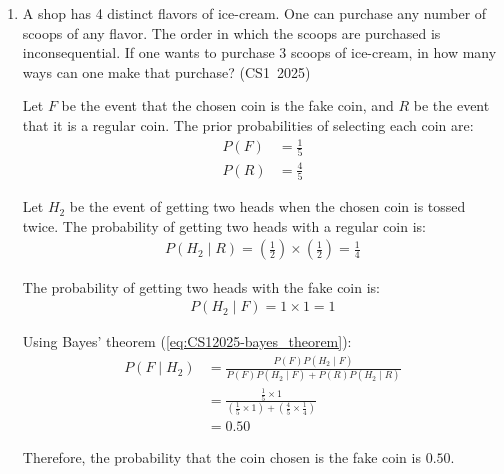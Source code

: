 \begin{enumerate}[label=\thesubsection.\arabic*, ref=\thesubsection.\theenumi]
\vspace{0.5cm}
\item A shop has 4 distinct flavors of ice-cream. One can purchase any number of scoops of any flavor. The order in which the scoops are purchased is inconsequential. If one wants to purchase 3 scoops of ice-cream, in how many ways can one make that purchase?
\hfill (CS1~2025)
\begin{enumerate}
	\begin{multicols}{4}
    \item $4$
    \item $20$
    \item $24$
    \item $48$
	\end{multicols}
\end{enumerate}

\vspace{0.2cm}
\solution
Let $F$ be the event that the chosen coin is the fake coin, and $R$ be the event that it is a regular coin. The prior probabilities of selecting each coin are:
\begin{align}
P(F) &= \frac{1}{5} \\
P(R) &= \frac{4}{5}
\end{align}

Let $H_2$ be the event of getting two heads when the chosen coin is tossed twice. 
The probability of getting two heads with a regular coin is:
\begin{align}
P(H_2 \mid R) = \left(\frac{1}{2}\right) \times \left(\frac{1}{2}\right) = \frac{1}{4}
\end{align}

The probability of getting two heads with the fake coin is:
\begin{align}
P(H_2 \mid F) = 1 \times 1 = 1
\end{align}

Using Bayes' theorem (\ref{eq:CS12025-bayes_theorem}):
\begin{align}
P(F \mid H_2) &= \frac{P(F) P(H_2 \mid F)}{P(F) P(H_2 \mid F) + P(R) P(H_2 \mid R)} \\
              &= \frac{\frac{1}{5} \times 1}{\left(\frac{1}{5} \times 1\right) + \left(\frac{4}{5} \times \frac{1}{4}\right)} \\
              &= 0.50
\end{align}

Therefore, the probability that the coin chosen is the fake coin is $0.50$.


\end{enumerate}
